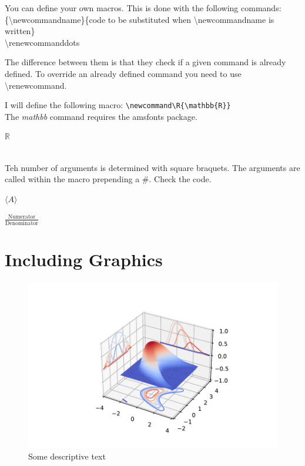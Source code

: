 \documentclass[a4paper]{article}
\newcommand{\bs}[1]{{\color{blue}\textbackslash{}#1}}
\begin{document}
You can define your own macros. This is done with the following commands:\\

\noindent\bs{newcommand}\{\bs{newcommandname}\}\{code to be substituted when \bs{newcommandname} is written\}\\
\bs{renewcommand}dots

The difference between them is that they check if a given command is already defined. To override an already defined command you need to use \bs{renewcommand}.

\noindent I will define the following macro:
\noindent \verb!\newcommand\R{\mathbb{R}}!\\

\noindent The \emph{mathbb} command requires the amsfonts package.\\
 
\newcommand\R{\mathbb{R}} %


$\R$

\\

Teh number of arguments is determined with square braquets. The arguments are called within the macro prepending a \#. Check the code.

\newcommand\average[1]{\langle#1\rangle}

$\average{A}$\\

\newcommand\fraction[2]{\frac{#1}{#2}}

$\fraction{\text{Numerator}}{\text{Denominator}}$\\


\section{Including Graphics}

\begin{figure}[h]
  \includegraphics{3dplot.pdf}
  \caption{Some descriptive text}\label{referencefigure}
\end{figure}
\end{document}
